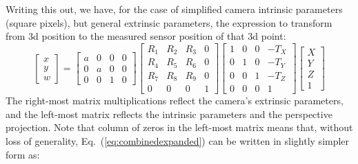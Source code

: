 Writing this out, we have, for the case of simplified camera intrinsic parameters (square pixels), but general extrinsic parameters, the expression to transform from 3d position to the measured sensor position of that 3d point:
\begin{equation}
        \left [
    \begin{array}{c}
    x \\
    y \\
    w
    \end{array}
    \right ] 
=
 \left [
    \begin{array}{cccc}
    a & 0 & 0 & 0 \\
    0 & a & 0 & 0 \\
    0 & 0 & 1 & 0
    \end{array}
    \right ]
     \left [
    \begin{array}{cccc}
    R_1 & R_2 & R_3  & 0 \\
    R_4 & R_5 & R_6 & 0 \\
    R_7 & R_8 & R_9 & 0 \\
    0 & 0 & 0 & 1
    \end{array}
    \right ]
     \left [
    \begin{array}{cccc}
    1 & 0 & 0 & -T_X \\
    0 & 1 & 0 & -T_Y \\
    0 & 0 & 1 & -T_Z \\
    0 & 0 & 0 & 1
    \end{array}
    \right ]
        \left [
    \begin{array}{c}
    X \\
    Y \\
    Z \\
    1
    \end{array}
    \right ] 
    \label{eq:combinedexpanded}
\end{equation}
The right-most matrix multiplications reflect the camera's extrinsic parameters, and the left-most matrix reflects the intrinsic parameters and the perspective projection.  Note that column of zeros in the left-most matrix means that, without loss of generality, Eq.~(\ref{eq:combinedexpanded}) can be written in slightly simpler form as:

